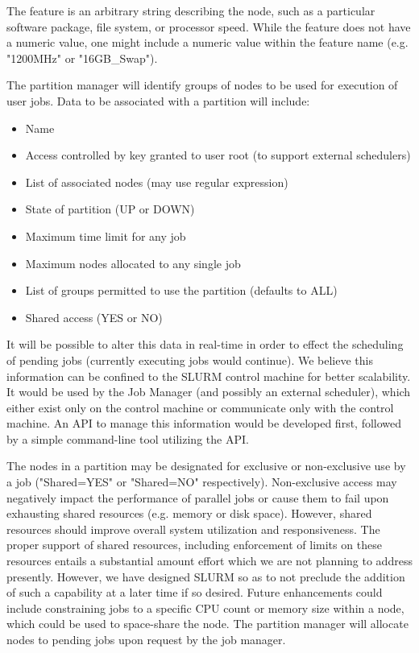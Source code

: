 The feature is an arbitrary string describing the node, such as a 
particular software package, file system, or processor speed. 
While the feature does not have a numeric value, one might include a numeric 
value within the feature name (e.g. "1200MHz" or "16GB\_Swap").

The partition manager will identify groups of nodes to be used for
execution of user jobs. Data to be associated with a partition will include:
\begin{itemize}
\item Name
\item Access controlled by key granted to user root (to support external schedulers)
\item List of associated nodes (may use regular expression)
\item State of partition (UP or DOWN)
\item Maximum time limit for any job
\item Maximum nodes allocated to any single job
\item List of groups permitted to use the partition (defaults to ALL)
\item Shared access (YES or NO)
\end{itemize}

It will be possible to alter this data in real-time in order to effect the
scheduling of pending jobs (currently executing jobs would continue). 
We believe this information can be
confined to the SLURM control machine for better scalability. It would be used
by the Job Manager (and possibly an external scheduler), which either exist only 
on the control machine or communicate only with the control machine. An API to 
manage this information would be developed first, followed by a simple command-line 
tool utilizing the API.

The nodes in a partition may be designated for exclusive or non-exclusive 
use by a job ("Shared=YES" or "Shared=NO" respectively).
Non-exclusive access may negatively impact the performance of parallel jobs 
or cause them to fail upon exhausting shared resources (e.g. memory or disk 
space). However, shared resources should improve overall system utilization 
and responsiveness. The proper support of shared resources, including 
enforcement of limits on these resources entails a substantial amount 
effort which we are not planning to address presently. 
However, we have designed SLURM so as to not preclude the addition of 
such a capability at a later time if so desired.
Future enhancements could include constraining jobs to a specific CPU count 
or memory size within a node, which could be used to space-share the node.
The partition manager will allocate nodes to pending jobs upon request by 
the job manager. 

